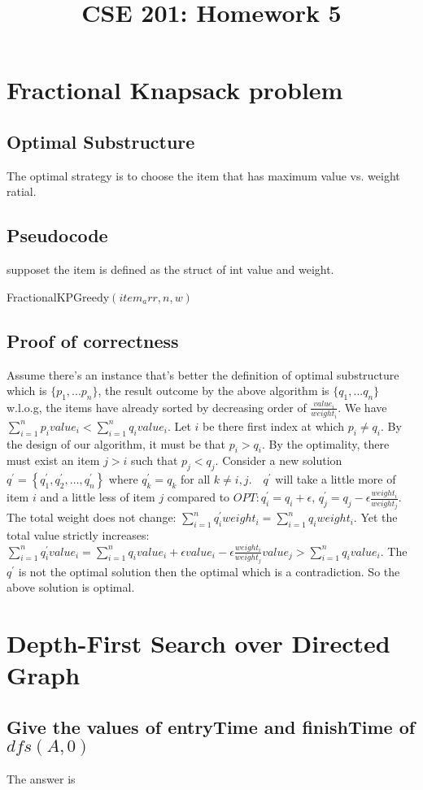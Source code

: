 \documentclass[a4paper]{article}
\title{CSE 201: Homework 5}
\begin{document}
\maketitle
\section{Fractional Knapsack problem}
\subsection{Optimal Substructure}
The optimal strategy is to choose the item that has maximum value vs. weight ratial.

\subsection{Pseudocode}
supposet the item is defined as the struct of int value and weight.
\begin{algorithm}
    \caption{FractionalKPGreedy$(item_arr,n,w)$}\label{alg:cap3}
    \begin{algorithmic}[1]
        \Else
        \EndIf
        \EndFor
    \end{algorithmic}
  \end{algorithm}
\subsection{Proof of correctness}
Assume there's an instance that's better the definition of optimal substructure which is $\{p_1,...p_n\}$, the result outcome by the above algorithm is $\{q_1,...q_n\}$ w.l.o.g, the items have already sorted by decreasing order of $\frac{value_i}{weight_i}$. We have $\sum_{i=1}^n p_i value_i<\sum_{i=1}^n q_i value_i$. Let $i$ be there first index at which $p_i \neq q_i$. By the design of our algorithm, it must be that $p_i>q_i$. By the optimality, there must exist an item $j>i$ such that $p_j<q_j$. Consider a new solution $q^{\prime}=\left\{q_1^{\prime}, q_2^{\prime}, \ldots, q_n^{\prime}\right\}$ where $q_k^{\prime}=q_k$ for all $k \neq i, j . \quad q^{\prime}$ will take a little more of item $i$ and a little less of item $j$ compared to $O P T: q_i^{\prime}=q_i+\epsilon$, $q_j^{\prime}=q_j-\epsilon \frac{weight_i}{weight_j}$. The total weight does not change: $\sum_{i=1}^n q_i^{\prime} weight_i=\sum_{i=1}^n q_i weight_i$. Yet the total value strictly increases: $\sum_{i=1}^n q_i^{\prime} value_i=\sum_{i=1}^n q_i value_i+\epsilon value_i-\epsilon \frac{weight_i}{weight_j} value_j>\sum_{i=1}^n q_i value_i$. The $q^{\prime}$ is not the optimal solution then the optimal which is a contradiction. So the above solution is optimal.

\section{Depth-First Search over Directed Graph}
\subsection{Give the values of entryTime and finishTime of $dfs(A, 0)$}
The answer is 

\
\end{document}
